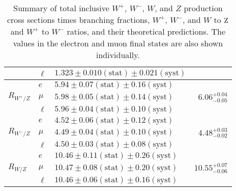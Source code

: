 \begin{table*}[tbhp]
\begin {tabular} {lllr}
  & $\ell$ & $1.323 \pm 0.010 \mathrm{(stat)}\pm 0.021 \mathrm{(syst)}$ & \\
\hline
             & $e$   & $5.94 \pm 0.07 \mathrm{(stat)}\pm 0.16 \mathrm{(syst)}$ &
             \\
$R_{W^{+}/Z}$   & $\mu$ & $5.98 \pm 0.05 \mathrm{(stat)}\pm 0.14 \mathrm{(syst)}$ & $6.06^{+0.04}_{-0.05}$ \\
             & $\ell$ & $5.96 \pm 0.04 \mathrm{(stat)}\pm 0.10 \mathrm{(syst)}$ &  \\
\hline
             & $e$   & $4.52 \pm 0.06 \mathrm{(stat)}\pm 0.12 \mathrm{(syst)}$ &
             \\
$R_{W^{-}/Z}$   & $\mu$ & $4.49 \pm 0.04 \mathrm{(stat)}\pm 0.10 \mathrm{(syst)}$ & $4.48^{+0.03}_{-0.02}$ \\
             & $\ell$ & $4.50 \pm 0.03 \mathrm{(stat)}\pm 0.08 \mathrm{(syst)}$ &  \\
\hline
             & $e$   & $10.46 \pm 0.11 \mathrm{(stat)}\pm 0.26 \mathrm{(syst)}$ &
             \\
$R_{W/Z}$   & $\mu$ & $10.47 \pm 0.08 \mathrm{(stat)}\pm 0.20 \mathrm{(syst)}$ & $10.55^{+0.07}_{-0.06}$ \\
             & $\ell$ & $10.46 \pm 0.06 \mathrm{(stat)}\pm 0.16 \mathrm{(syst)}$ &  \\
\hline
\end{tabular}
\caption{ \label{tab:results13}
Summary of total inclusive $W^{+}$, $W^{-}$, $W$, and $Z$ production cross sections times
branching fractions, $W^{+}$,  $W^{-}$, and $W$ to $\mathrm{Z}$ and $W^{+}$ to $W^{-}$ ratios, and their
theoretical predictions. The values in the electron and muon final states are also shown individually.}
\end{table*}

